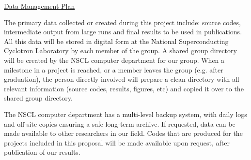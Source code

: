 \documentclass[11pt]{article}
\begin{document}
\centerline{\underline{\Large{Data Management Plan}}} 
\medskip
\medskip
The primary data  collected or created during this project include:
source codes, intermediate output from large runs and final results to be used in publications. All this data
will be stored in digital form at the National Superconducting Cyclotron Laboratory by each member of the group.
A shared group directory will be created by the NSCL computer department for our group. When a milestone in a project is reached,
or a member leaves the group (e.g. after graduation), the person directly involved  will prepare a clean directory with all relevant information
(source codes, results, figures, etc) and copied it over to the shared group directory.
 
The NSCL computer department has a multi-level backup system, with daily logs and off-site copies ensuring a safe long-term archive.
If requested, data can be made available to other researchers in our field. Codes that are produced for the projects included in this proposal
will be made available upon request, after publication of our results.
\end{document}
